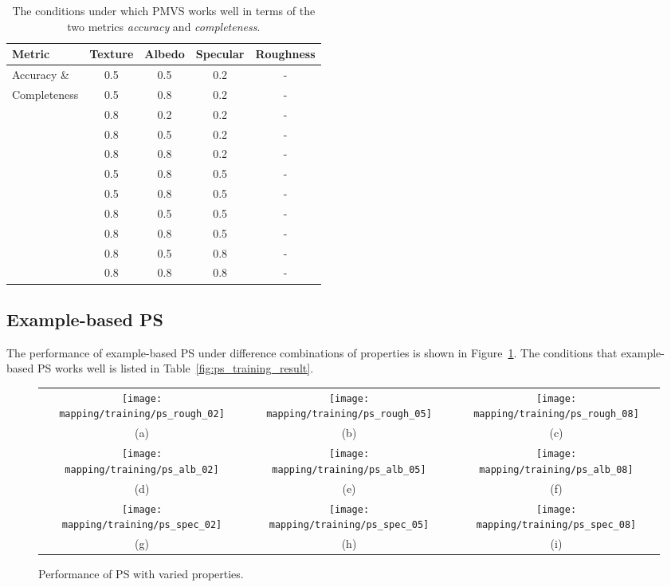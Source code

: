 \begin{table}[!htbp]
  \centering
  \begin{tabular}{l*{4}{c}}
  \hline
  \textbf{Metric} & Texture & Albedo & Specular & Roughness\\
  \hline
  Accuracy \&  & 0.5 & 0.5 & 0.2 & -\\
  Completeness & 0.5 & 0.8 & 0.2 & -\\
               & 0.8 & 0.2 & 0.2 & -\\
               & 0.8 & 0.5 & 0.2 & -\\
               & 0.8 & 0.8 & 0.2 & -\\
               & 0.5 & 0.8 & 0.5 & - \\
               & 0.5 & 0.8 & 0.5 & -\\
               & 0.8 & 0.5 & 0.5 & -\\
               & 0.8 & 0.8 & 0.5 & -\\
               & 0.8 & 0.5 & 0.8 & -\\
               & 0.8 & 0.8 & 0.8 & -\\
  \hline
  \end{tabular}
  \caption{The conditions under which PMVS works well in terms of the two metrics \textit{accuracy} and \textit{completeness}.}
  \label{tab:mvs_traing_result}
\end{table}

\subsection{Example-based PS}
The performance of example-based PS under difference combinations of properties is shown in Figure~\ref{fig:ps_training}. The conditions that example-based PS works well is listed in Table~\ref{fig:ps_training_result}.
\begin{figure}[!htbp]
\begin{tabular}{ccc}
\texttt{[image: mapping/training/ps\_rough\_02]}&
\texttt{[image: mapping/training/ps\_rough\_05]}&
\texttt{[image: mapping/training/ps\_rough\_08]}\\
(a) & (b) & (c)\\
\texttt{[image: mapping/training/ps\_alb\_02]}&
\texttt{[image: mapping/training/ps\_alb\_05]}&
\texttt{[image: mapping/training/ps\_alb\_08]}\\
(d) & (e) & (f)\\
\texttt{[image: mapping/training/ps\_spec\_02]}&
\texttt{[image: mapping/training/ps\_spec\_05]}&
\texttt{[image: mapping/training/ps\_spec\_08]}\\
(g) & (h) & (i)\\
\end{tabular}
\caption{Performance of PS with varied properties.}
\label{fig:ps_training}
\end{figure}

